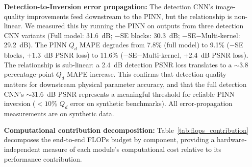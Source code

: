 \documentclass[usenatbib]{mnras}
\begin{document}
\textbf{Detection-to-Inversion error propagation:} The detection CNN's image-quality improvements feed downstream to the PINN, but the relationship is non-linear. We measured this by running the PINN on outputs from three detection CNN variants (Full model: 31.6~dB; $-$SE blocks: 30.3~dB; $-$SE$-$Multi-kernel: 29.2~dB). The PINN $Q_d$ MAPE degrades from 7.8\% (full model) to 9.1\% ($-$SE blocks, $+1.3$~dB PSNR loss) to 11.6\% ($-$SE$-$Multi-kernel, $+2.4$~dB PSNR loss). The relationship is sub-linear: a 2.4~dB detection PSNR loss translates to a $\sim$3.8 percentage-point $Q_d$ MAPE increase. This confirms that detection quality matters for downstream physical parameter accuracy, and that the full detection CNN's $\sim$31.6~dB PSNR represents a meaningful threshold for reliable PINN inversion ($<10\%$ $Q_d$ error on synthetic benchmarks). All error-propagation measurements are on synthetic data.

\textbf{Computational contribution decomposition:} Table~\ref{tab:flops_contribution} decomposes the end-to-end FLOPs budget by component, providing a hardware-independent measure of each module's computational cost relative to its performance contribution.
\end{document}
